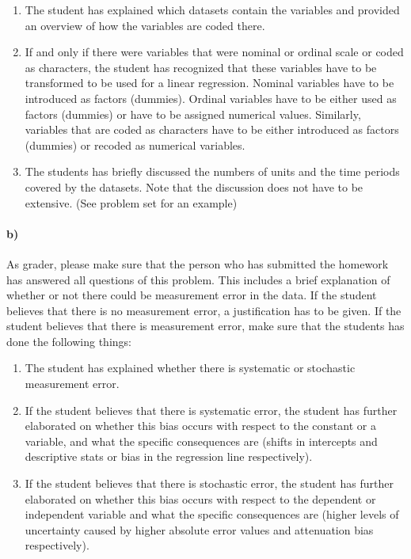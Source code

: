 \documentclass[12pt]{article}\usepackage[]{graphicx}\usepackage[]{color}
\begin{document}
\begin{enumerate}
	\item The student has explained which datasets contain the variables and provided an overview of how the variables are coded there.
	\item If and only if there were variables that were nominal or ordinal scale or coded as characters, the student has recognized that these variables have to be transformed to be used for a linear regression. Nominal variables have to be introduced as factors (dummies). Ordinal variables have to be either used as factors (dummies) or have to be assigned numerical values. Similarly, variables that are coded as characters have to be either introduced as factors (dummies) or recoded as numerical variables.
	\item The students has briefly discussed the numbers of units and the time periods covered by the datasets. Note that the discussion does not have to be extensive. (See problem set for an example)
\end{enumerate}

\paragraph*{b)} As grader, please make sure that the person who has submitted the homework has answered all questions of this problem. This includes a brief explanation of whether or not there could be measurement error in the data. If the student believes that there is no measurement error, a justification has to be given. If the student believes that there is measurement error, make sure that the students has done the following things:

\begin{enumerate}
  \item The student has explained whether there is systematic or stochastic measurement error.
  \item If the student believes that there is systematic error, the student has further elaborated on whether this bias occurs with respect to the constant or a variable, and what the specific consequences are (shifts in intercepts and descriptive stats or bias in the regression line respectively).
  \item If the student believes that there is stochastic error, the student has further elaborated on whether this bias occurs with respect to the dependent or independent variable and what the specific consequences are (higher levels of uncertainty caused by higher absolute error values and attenuation bias respectively).
\end{enumerate}
\end{document}
